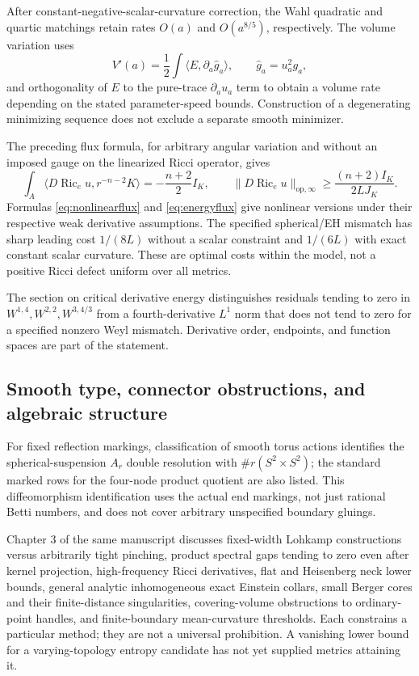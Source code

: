 \documentclass[a4paper,11pt]{article}
\numberwithin{equation}{section}
\theoremstyle{definition}
\newcommand{\Ric}{\operatorname{Ric}}
\newcommand{\op}{\mathrm{op}}
\begin{document}
After constant-negative-scalar-curvature correction, the Wahl quadratic and quartic matchings retain rates $O(a)$ and $O(a^{8/5})$, respectively. The volume variation uses
\[
V'(a)=\frac12\int\langle E,\partial_a\widehat g_a\rangle,
\qquad \widehat g_a=u_a^2g_a,
\]
and orthogonality of $E$ to the pure-trace $\partial_a u_a$ term to obtain a volume rate depending on the stated parameter-speed bounds. Construction of a degenerating minimizing sequence does not exclude a separate smooth minimizer.

The preceding flux formula, for arbitrary angular variation and without an imposed gauge on the linearized Ricci operator, gives
\[
\int_A\langle D\Ric_eu,r^{-n-2}K\rangle
=-\frac{n+2}{2}I_K,
\qquad
\|D\Ric_eu\|_{\op,\infty}\ge\frac{(n+2)I_K}{2LJ_K}.
\]
Formulas \eqref{eq:nonlinearflux} and \eqref{eq:energyflux} give nonlinear versions under their respective weak derivative assumptions. The specified spherical/EH mismatch has sharp leading cost $1/(8L)$ without a scalar constraint and $1/(6L)$ with exact constant scalar curvature. These are optimal costs within the model, not a positive Ricci defect uniform over all metrics.

The section on critical derivative energy distinguishes
residuals tending to zero in $W^{1,4},W^{2,2},W^{3,4/3}$ from a fourth-derivative $L^1$ norm that does not tend to zero for a specified nonzero Weyl mismatch. Derivative order, endpoints, and function spaces are part of the statement.

\subsection{Smooth type, connector obstructions, and algebraic structure}
For fixed reflection markings, classification of smooth torus actions identifies the spherical-suspension $A_r$ double resolution with $\#r(S^2\times S^2)$; the standard marked rows for the four-node product quotient are also listed. This diffeomorphism identification uses the actual end markings, not just rational Betti numbers, and does not cover arbitrary unspecified boundary gluings.

Chapter 3 of the same manuscript discusses fixed-width Lohkamp constructions versus arbitrarily tight pinching, product spectral gaps tending to zero even after kernel projection, high-frequency Ricci derivatives, flat and Heisenberg neck lower bounds, general analytic inhomogeneous exact Einstein collars, small Berger cores and their finite-distance singularities, covering-volume obstructions to ordinary-point handles, and finite-boundary mean-curvature thresholds. Each constrains a particular method; they are not a universal prohibition. A vanishing lower bound for a varying-topology entropy candidate has not yet supplied metrics attaining it.
\end{document}
